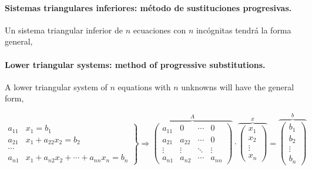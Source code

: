 \begin{paracol}{2}
\paragraph{Sistemas triangulares inferiores: método de sustituciones progresivas.} Un sistema triangular inferior de $n$ ecuaciones con $n$ incógnitas tendrá la forma general,
\switchcolumn
\paragraph{Lower triangular systems: method of progressive substitutions.} A lower triangular system of $n$ equations with $n$ unknowns will have the general form,
\end{paracol}

\begin{equation*}
\left. \begin{aligned}
a_{11}&x_1=b_1\\
a_{21}&x_1+a_{22}x_2=b_2\\
\cdots & \\
a_{n1}&x_1+a_{n2}x_2+\cdots +a_{nn}x_n=b_n
\end{aligned}\right\} \Rightarrow	\overbrace{\begin{pmatrix}
a_{11}& 0& \cdots & 0\\
a_{21}& a_{22}& \cdots & 0\\
\vdots & \vdots & \ddots & \vdots\\
a_{n1}& a_{n2}& \cdots & a_{nn}
\end{pmatrix}}^A \cdot \overbrace{\begin{pmatrix}
x_1\\
x_2\\
\vdots \\
x_n
\end{pmatrix}}^x=\overbrace{\begin{pmatrix}
b_1\\
b_2\\
\vdots \\
b_n
\end{pmatrix}}^b
\end{equation*}

